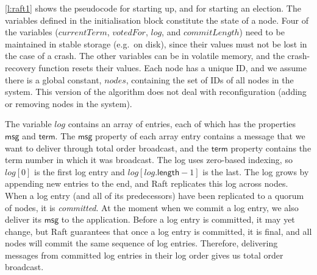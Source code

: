 



\autoref{l:raft1} shows the pseudocode for starting up, and for starting an election.
The variables defined in the initialisation block constitute the state of a node.
Four of the variables ($\mathit{currentTerm}$, $\mathit{votedFor}$, $\mathit{log}$, and $\mathit{commitLength}$) need to be maintained in stable storage (e.g.\ on disk), since their values must not be lost in the case of a crash.
The other variables can be in volatile memory, and the crash-recovery function resets their values.
Each node has a unique ID, and we assume there is a global constant, $\mathit{nodes}$, containing the set of IDs of all nodes in the system.
This version of the algorithm does not deal with reconfiguration (adding or removing nodes in the system).

The variable $\mathit{log}$ contains an array of entries, each of which has the properties $\mathsf{msg}$ and $\mathsf{term}$.
The $\mathsf{msg}$ property of each array entry contains a message that we want to deliver through total order broadcast, and the $\mathsf{term}$ property contains the term number in which it was broadcast.
The log uses zero-based indexing, so $\mathit{log}[0]$ is the first log entry and $\mathit{log}[\mathit{log}.\mathsf{length}-1]$ is the last.
The log grows by appending new entries to the end, and Raft replicates this log across nodes.
When a log entry (and all of its predecessors) have been replicated to a quorum of nodes, it is \emph{committed}.
At the moment when we commit a log entry, we also deliver its $\mathsf{msg}$ to the application.
Before a log entry is committed, it may yet change, but Raft guarantees that once a log entry is committed, it is final, and all nodes will commit the same sequence of log entries.
Therefore, delivering messages from committed log entries in their log order gives us total order broadcast.

